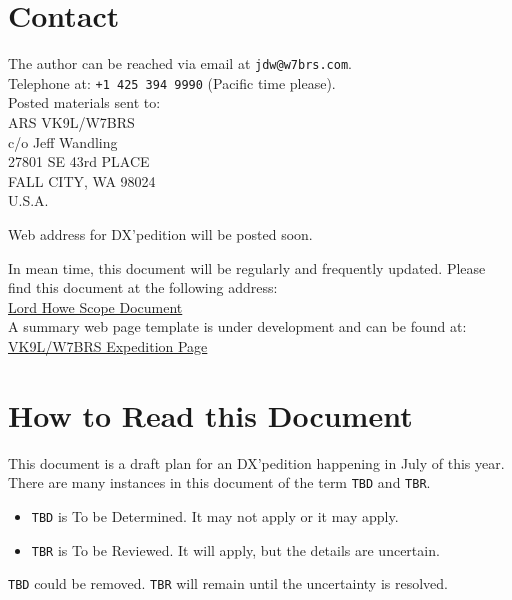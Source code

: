 \documentclass[11pt]{article}
\begin{document}
\section*{Contact}
The author can be reached via email at {\texttt{jdw@w7brs.com}}.\\[1cm]
Telephone at: {\texttt{+1 425 394 9990}} (Pacific time please).\\[5mm]
Posted materials sent to:\\[4mm]
ARS VK9L/W7BRS\\
c/o Jeff Wandling\\
27801 SE 43rd PLACE\\
FALL CITY, WA 98024\\
U.S.A.\\
\par
\noindent
Web address for DX'pedition will be posted soon.
\par
\noindent
In mean time, this document will be regularly and frequently updated.
Please find this document at the following address:\\[3mm]
\noindent
\href{http://w7brs.com/vk9l/vk9l.pdf}{Lord Howe Scope Document}\\[3mm]
\noindent
A summary web page template is under development and can be found at:\\[3mm]
\noindent
\href{http://w7brs.com/vk9l}{VK9L/W7BRS Expedition Page}\\[3mm]
\par
\newpage

\tableofcontents
\listoffigures
\listoftables

\newpage
\section{How to Read this Document}

This document is a draft plan for an DX'pedition happening in July
of this year.   There are many instances in this document of the term
{\texttt{TBD}} and {\texttt{TBR}}. 
\begin{itemize}
\item {\texttt{TBD}} is To be Determined.  It may not apply or it may apply.
\item {\texttt{TBR}} is To be Reviewed. It will apply, but the details
are uncertain.
\end{itemize}

{\texttt{TBD}} could be removed. {\texttt{TBR}} will remain until the
uncertainty is resolved.
\end{document}
